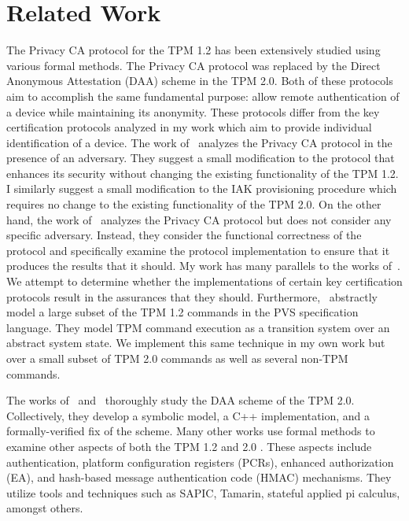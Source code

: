 \documentclass[runningheads]{llncs}
\begin{document}
\section{Related Work}
The Privacy CA protocol for the TPM 1.2 has been extensively studied
using various formal methods. The Privacy CA protocol was replaced by
the Direct Anonymous Attestation (DAA) scheme in the TPM 2.0. Both of
these protocols aim to accomplish the same fundamental purpose: allow
remote authentication of a device while maintaining its
anonymity. These protocols differ from the key certification protocols
analyzed in my work which aim to provide individual identification of
a device.  The work of~\citet{PrivacyCAAnalysis-Chen} analyzes the
Privacy CA protocol in the presence of an adversary. They suggest a
small modification to the protocol that enhances its security without
changing the existing functionality of the TPM 1.2. I similarly
suggest a small modification to the IAK provisioning procedure which
requires no change to the existing functionality of the TPM 2.0.  On
the other hand, the work of~\citet{PrivacyCAAnalysis-Hall,TPM12Model}
analyzes the Privacy CA protocol but does not consider any specific
adversary. Instead, they consider the functional correctness of the
protocol and specifically examine the protocol implementation to
ensure that it produces the results that it should.  My work has many
parallels to the works of~\citeauthor{PrivacyCAAnalysis-Hall}.  We
attempt to determine whether the implementations of certain key
certification protocols result in the assurances that they should.
Furthermore,~\citeauthor{PrivacyCAAnalysis-Hall} abstractly model a
large subset of the TPM 1.2 commands in the PVS specification
language. They model TPM command execution as a transition system over
an abstract system state. We implement this same technique in my own
work but over a small subset of TPM 2.0 commands as well as several
non-TPM commands.

The works of~\citet{DAAAnalysis-Whit} and~\citet{DAAAnalysis-Wes}
thoroughly study the DAA scheme of the TPM 2.0. Collectively, they
develop a symbolic model, a C++ implementation, and a
formally-verified fix of the scheme.  Many other works use formal
methods to examine other aspects of both the TPM 1.2
\citep{AuthAnalysis,PCRAnalysis} and 2.0
\citep{EAAnalysis,HMACAnalysis}.  These aspects include
authentication, platform configuration registers (PCRs), enhanced
authorization (EA), and hash-based message authentication code (HMAC)
mechanisms. They utilize tools and techniques such as SAPIC, Tamarin,
stateful applied pi calculus, amongst others.
%
%
%
\end{document}
